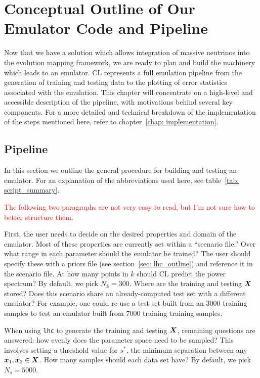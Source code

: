 \chapter{Conceptual Outline of Our Emulator Code and Pipeline}
\label{chap: emu_outline}

Now that we have a solution which allows integration of massive neutrinos
into the evolution mapping framework, we are ready to plan and build the
machinery which leads to an emulator. CL represents a full emulation pipeline from the generation of training and 
testing data to the plotting of error statistics associated with
the emulation. This chapter will concentrate on a high-level and accessible 
description of the pipeline, with motivations behind several key components.
For a more detailed and technical breakdown of the implementation of the steps
mentioned here, refer to chapter~\ref{chap: implementation}.

\section{Pipeline}
\label{sec: flow_chart}


In this section we outline the general procedure for building and testing an
emulator. For an explanation of the abbreviations used here, see table~\ref{tab: script_summary}. 

\textcolor{red}{The following two paragraphs are not very easy to read, but 
I'm not sure how to better structure them.}

First, the user needs to decide on the desired properties and domain of the
emulator. Most of these properties are currently set within a ``scenario
file.'' Over what range in each parameter should the emulator be trained?
The user should specify these with a priors file (see section~\ref{sec: 
lhc_outline}) and reference it in the scenario file. At how many points in
$k$ should CL predict the power spectrum? By default, we pick $N_k = 300$. 
Where are the training and testing $\bm{X}$ stored?
Does this scenario share an
already-computed test set with a different emulator? For example, one could
re-use a test set built from an 3000 training samples to test an emulator 
built from 7000 training training samples.

When using \texttt{lhc} to generate the training and testing
$\bm{X}$, remaining questions are answered: how evenly does the parameter
space need to be sampled? This involves setting a threshold value for $s^*$,
the minimum separation between any $\bm{x}_1, \bm{x}_2 \in \bm{X}$.
How many samples should each data set have? By default, we pick $N_s = 5000$.

